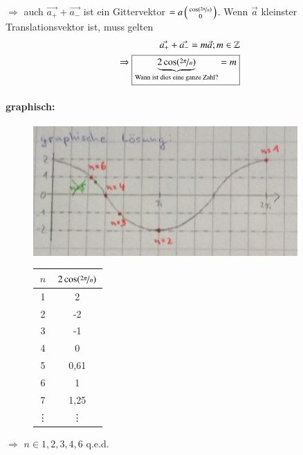 \documentclass[paper=A4,12pt,pagesize,twoside,BCOR=8mm,ngerman]{scrartcl}
\begin{document}
			$\Rightarrow$ auch $\vec{a_+}+\vec{a_-}$ ist ein 
			Gittervektor $=a \left( \begin{smallmatrix} \cos 
			(\nicefrac{2\pi}{n})\\ 0 \end{smallmatrix} \right)$. Wenn 
			$\vec{a}$ kleinster Translationsvektor ist, muss gelten
			\begin{align*}
				\vec{a_+}+\vec{a_-} = m \vec{a}; m \in \mathbb{Z}\\
				\Rightarrow \boxed{\underbrace{2\cos 
				(\nicefrac{2\pi}{n})}_{\text{\normalfont Wann ist dies 
				eine ganze Zahl?}} = m}	
			\end{align*}
			\paragraph*{graphisch:}
			\begin{figure}[H]
				\centering
				\begin{minipage}[c]{0.6\textwidth}
					\centering
					\includegraphics[width=0.9\textwidth]
					{pics/pic005.jpg}
				\end{minipage}	
				\begin{minipage}[c]{0.39\textwidth}
					\centering
					\begin{tabular}{cc}
						\toprule
						$n$ & $2 \cos (\nicefrac{2\pi}{n})$ \\
						\midrule
						1	&	2	\\
						2	&	-2	\\
						3	&	-1	\\
						4	&	0	\\
						5	&	0,61\\
						6	&	1	\\
						7	&	1,25\\
						\vdots & \vdots\\
						\bottomrule
					\end{tabular}
				\end{minipage}	
			\end{figure}
			$\Rightarrow$ $n \in {1, 2, 3, 4, 6}$ q.e.d.\\
			
\end{document}
